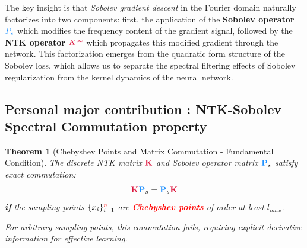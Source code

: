 \documentclass[a4paper]{article}
\newcommand{\Kop}{\textcolor{kernelcolor}{\mathbf{K}}}
\newcommand{\Pop}{\textcolor{sobolevcolor}{\mathbf{P}}}
\newcommand{\Kinf}{\textcolor{kernelcolor}{K^{\infty}}}
\newcommand{\Ps}{\textcolor{sobolevcolor}{P_s}}
\theoremstyle{plain}
\newtheorem{theorem}{Theorem}[section]
\theoremstyle{definition}
\theoremstyle{remark}
\newcommand{\Kop}{\textcolor{kernelcolor}{\mathbf{K}}}
\newcommand{\Pop}{\textcolor{sobolevcolor}{\mathbf{P}}}
\newcommand{\Kinf}{\textcolor{kernelcolor}{K^{\infty}}}
\newcommand{\Ps}{\textcolor{sobolevcolor}{P_s}}
\begin{document}
\begin{tcolorbox}[colback=green!10,colframe=green!60!black,title={\textbf{Insight : Factorization of Learning Dynamics}},enhanced,drop shadow]
    The key insight is that \textit{Sobolev gradient descent} in the Fourier domain naturally factorizes into two components: first, the application of the \textcolor{sobolevcolor}{\textbf{Sobolev operator}} $\Ps$ which modifies the frequency content of the gradient signal, followed by the \textcolor{kernelcolor}{\textbf{NTK operator}} $\Kinf$ which propagates this modified gradient through the network. This factorization emerges from the quadratic form structure of the Sobolev loss, which allows us to separate the spectral filtering effects of Sobolev regularization from the kernel dynamics of the neural network.
\end{tcolorbox}







\subsection{Personal major contribution : NTK-Sobolev Spectral Commutation property}

\begin{theorem}[Chebyshev Points and Matrix Commutation - Fundamental Condition]
\label{thm:chebyshev_commutation}
The discrete NTK matrix $\Kop$ and Sobolev operator matrix $\Pop_s$ satisfy exact commutation:
\begin{equation}
\Kop \Pop_s = \Pop_s \Kop
\label{eq:chebyshev_commutation_condition}
\end{equation}
\textbf{if} the sampling points $\{x_i\}_{i=1}^{\textcolor{red}{n}}$ are \textcolor{red}{\textbf{Chebyshev points}} of order at least $l_{max}$.	

For arbitrary sampling points, this commutation \textit{fails}, requiring explicit derivative information for effective learning.
\end{theorem}
\end{document}
